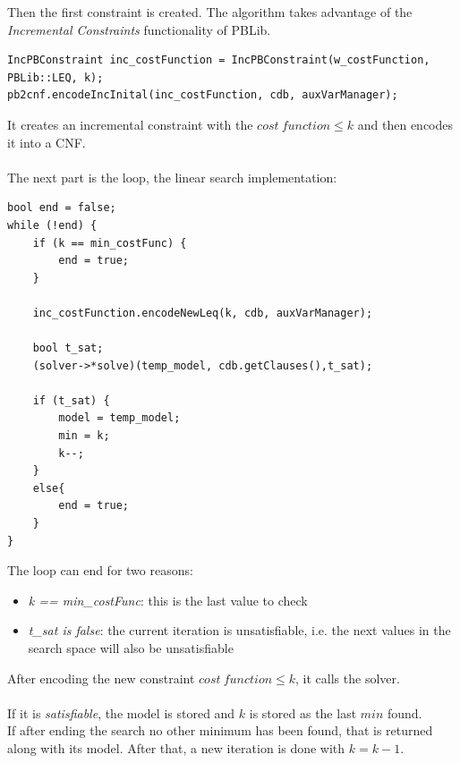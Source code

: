 Then the first constraint is created. The algorithm takes advantage of the \emph{Incremental Constraints} functionality of PBLib.
\begin{verbatim}
IncPBConstraint inc_costFunction = IncPBConstraint(w_costFunction, PBLib::LEQ, k);
pb2cnf.encodeIncInital(inc_costFunction, cdb, auxVarManager);
\end{verbatim}
It creates an incremental constraint with the $cost \ function \leq k$ and then encodes it into a CNF.\\\\
The next part is the loop, the linear search implementation:
\begin{verbatim}
bool end = false;
while (!end) {
    if (k == min_costFunc) {
        end = true;
    }
	
    inc_costFunction.encodeNewLeq(k, cdb, auxVarManager);
	
    bool t_sat;
    (solver->*solve)(temp_model, cdb.getClauses(),t_sat);
	
    if (t_sat) {
        model = temp_model;
        min = k;
        k--;
    }
    else{
        end = true;
    }
}
\end{verbatim}
The loop can end for two reasons:
\begin{itemize}
	\item \emph{k == min\_costFunc}: this is the last value to check
	\item \emph{t\_sat is false}: the current iteration is unsatisfiable, i.e. the next values in the search space will also be unsatisfiable 
\end{itemize}
After encoding the new constraint $cost \ function \leq k$, it calls the solver.\\\\
If it is \emph{satisfiable}, the model is stored and $k$ is stored as the last $min$ found.\\
If after ending the search no other minimum has been found, that is returned along with its model. After that, a new iteration is done with $k=k-1$.

